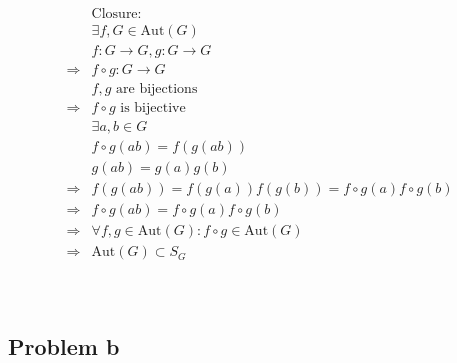 \documentclass{article}
\begin{document}
\begin{equation*}
    \begin{split}
        &\text{Closure}:\\
        &\exists f,G\in\text{Aut}(G)\\
        &f:G\rightarrow G,g:G\rightarrow G\\
        \Rightarrow&f\circ g:G\rightarrow G\\
        &f,g\text{ are bijections}\\
        \Rightarrow&f\circ g\text{ is bijective}\\
        &\exists a,b\in G\\
        &f\circ g(ab)=f(g(ab))\\
        &g(ab)=g(a)g(b)\\
        \Rightarrow&f(g(ab))=f(g(a))f(g(b))=f\circ g(a)f\circ g(b)\\
        \Rightarrow&f\circ g(ab)=f\circ g(a)f\circ g(b)\\
        \Rightarrow&\forall f,g\in \text{Aut}(G):f\circ g\in\text{Aut}(G)\\
        \Rightarrow&\text{Aut}(G)\subset S_G\\
    \end{split}
\end{equation*}

~

\subsection*{Problem b}

~
\end{document}
